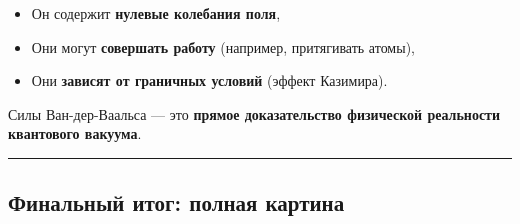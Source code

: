 \documentclass[11pt]{article}
\providecommand{\tightlist}{%
      \setlength{\itemsep}{0pt}\setlength{\parskip}{0pt}}
\begin{document}
\begin{itemize}
\tightlist
\item
  Он содержит \textbf{нулевые колебания поля},
\item
  Они могут \textbf{совершать работу} (например, притягивать атомы),
\item
  Они \textbf{зависят от граничных условий} (эффект Казимира).
\end{itemize}

Силы Ван-дер-Ваальса --- это \textbf{прямое доказательство физической
реальности квантового вакуума}.

\begin{center}\rule{0.5\linewidth}{\linethickness}\end{center}

\subsection{Финальный итог: полная
картина}\label{ux444ux438ux43dux430ux43bux44cux43dux44bux439-ux438ux442ux43eux433-ux43fux43eux43bux43dux430ux44f-ux43aux430ux440ux442ux438ux43dux430}
\end{document}
